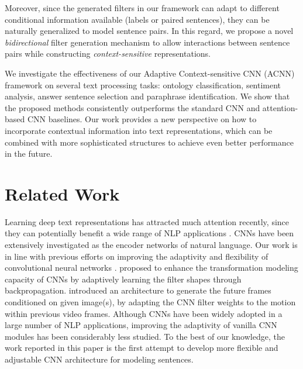 \documentclass[11pt,a4paper]{article}
\begin{document}
Moreover, since the generated filters in our framework can adapt to different conditional information available (labels or paired sentences), they can be naturally generalized to model sentence pairs. In this regard, we propose a novel \emph{bidirectional} filter generation mechanism to allow interactions between sentence pairs while constructing \emph{context-sensitive} representations.

We investigate the effectiveness of our Adaptive Context-sensitive CNN (ACNN) framework on several text processing tasks: ontology classification, sentiment analysis, answer sentence selection and paraphrase identification. We show that the proposed methods consistently outperforms the standard CNN and attention-based CNN baselines. Our work provides a new perspective on how to incorporate contextual information into text representations, which can be combined with more sophisticated structures to achieve even better performance in the future.

\section{Related Work}
Learning deep text representations has attracted much attention recently,  since they can potentially benefit a wide range of NLP applications \citep{collobert2011natural, kim2014convolutional, wang2017topic, Shen2018NASHTE, tang2018multi, zhang2018diffusion}. CNNs have been extensively investigated as the encoder networks of natural language. Our work is in line with previous efforts on improving the adaptivity and flexibility of convolutional neural networks \citep{jeon2017active,de2016dynamic}.
\citet{jeon2017active} proposed to enhance the transformation modeling capacity of CNNs by adaptively learning the filter shapes through backpropagation. 
\citet{de2016dynamic} introduced an architecture to generate the future frames conditioned on given image(s), by adapting the CNN filter weights to the motion within previous video frames. Although CNNs have been widely adopted in a large number of NLP applications, improving the adaptivity of vanilla CNN modules has been considerably less studied. To the best of our knowledge, the work reported in this paper is the first attempt to develop more flexible and adjustable CNN architecture for modeling sentences. 
\end{document}
